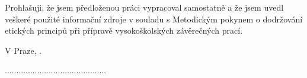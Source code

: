 \begin{declaration}
	Prohlašuji, že jsem předloženou práci vypracoval
samostatně a že jsem uvedl veškeré použité informační zdroje v souladu
s Metodickým pokynem o dodržování etických principů při přípravě vysokoškolských
závěrečných prací.\par
	\vspace{5mm}
	\noindent V Praze, .~~
	\par
	\vspace{5mm}
	\noindent............................................
\end{declaration}


